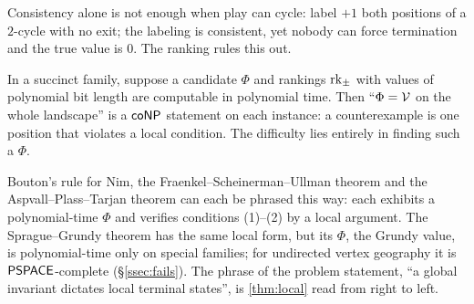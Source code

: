 Consistency alone is not enough when play can cycle: label $+1$ both positions of a $2$-cycle with no exit; the labeling is consistent, yet nobody can force termination and the true value is $0$. The ranking rules this out.

\begin{corollary}\label{cor:certify}
In a succinct family, suppose a candidate $\Phi$ and rankings $\operatorname{rk}_{\pm}$ with values of polynomial bit length are computable in polynomial time. Then ``$\Phi=\mathcal{V}$ on the whole landscape'' is a $\mathsf{coNP}$ statement on each instance: a counterexample is one position that violates a local condition. The difficulty lies entirely in finding such a $\Phi$.
\end{corollary}

\begin{remark}\label{rem:template}
Bouton's rule for Nim, the Fraenkel--Scheinerman--Ullman theorem and the Aspvall--Plass--Tarjan theorem can each be phrased this way: each exhibits a polynomial-time $\Phi$ and verifies conditions (1)--(2) by a local argument. The Sprague--Grundy theorem has the same local form, but its $\Phi$, the Grundy value, is polynomial-time only on special families; for undirected vertex geography it is $\mathsf{PSPACE}$-complete (\S\ref{ssec:fails}). The phrase of the problem statement, ``a global invariant dictates local terminal states'', is \cref{thm:local} read from right to left.
\end{remark}
